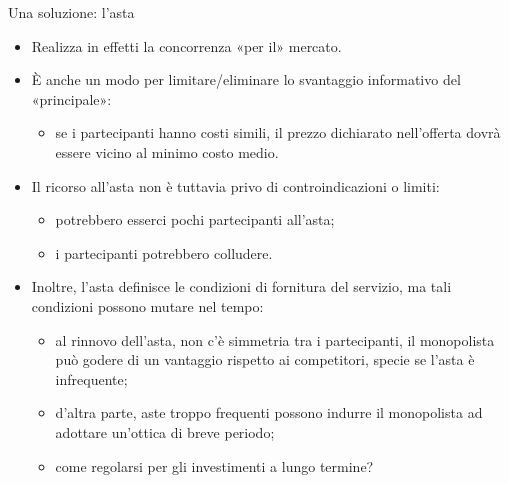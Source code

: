 \documentclass[aspectratio=64,12pt]{beamer}
\begin{document}
\begin{frame}{Una soluzione: l'asta}
\begin{itemize}
\item Realizza in effetti la concorrenza «per il» mercato.
\item È anche un modo per limitare/eliminare lo svantaggio informativo del «principale»:
\begin{itemize}
\item se i partecipanti hanno costi simili, il prezzo dichiarato nell'offerta
  dovrà essere vicino al minimo costo medio.
\end{itemize}
\item Il ricorso all'asta non è tuttavia privo di controindicazioni o limiti:
\begin{itemize}
\item potrebbero esserci pochi partecipanti all'asta;
\item i partecipanti potrebbero colludere.
\end{itemize}
\item Inoltre, l'asta definisce le condizioni di fornitura del servizio, ma tali
condizioni possono mutare nel tempo:
\begin{itemize}
\item al rinnovo dell'asta, non c'è simmetria tra i partecipanti, il
  monopolista può godere di un vantaggio rispetto ai competitori, specie se
  l'asta è infrequente;
\item d'altra parte, aste troppo frequenti possono indurre il monopolista ad
  adottare un'ottica di breve periodo;
\item come regolarsi per gli investimenti a lungo termine?
\end{itemize}
\end{itemize}
\end{frame}
\end{document}
